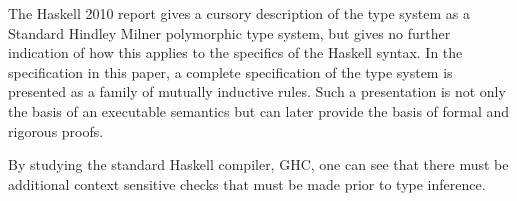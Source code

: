 The Haskell 2010 report gives a cursory description of the type system as a Standard Hindley Milner polymorphic type system, but gives no further indication of how this applies to the specifics of the Haskell syntax. In the specification in this paper, a complete specification of the type system is presented as a family of mutually inductive rules. Such a presentation is not only the basis of an executable semantics but can later provide the basis of formal and rigorous proofs.

By studying the standard Haskell compiler, GHC, one can see that there must be additional context sensitive checks that must be made prior to type inference.